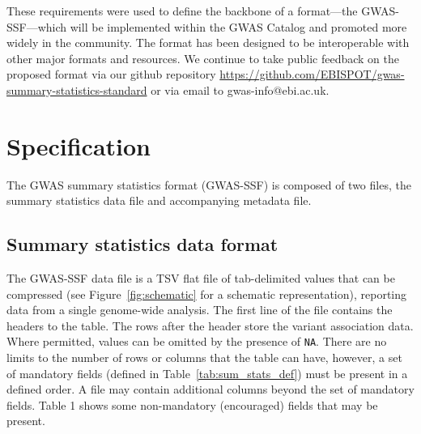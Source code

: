 \documentclass[11pt]{article}
\begin{document}
These requirements were used to define the backbone of a format---the GWAS-SSF---which will be implemented within the GWAS Catalog and promoted more widely in the community. The format has been designed to be interoperable with other major formats and resources. We continue to take public feedback on the proposed format via our github repository \url{https://github.com/EBISPOT/gwas-summary-statistics-standard} or via email to gwas-info@ebi.ac.uk.

\section{Specification}
The GWAS summary statistics format (GWAS-SSF) is composed of two files, the summary statistics data file and accompanying metadata file.

\subsection{Summary statistics data format}
The GWAS-SSF data file is a TSV flat file of tab-delimited values that can be compressed (see Figure~\ref{fig:schematic} for a schematic representation), reporting data from a single genome-wide analysis. The first line of the file contains the headers to the table. The rows after the header store the variant association data. Where permitted, values can be omitted by the presence of \texttt{NA}. There are no limits to the number of rows or columns that the table can have, however, a set of mandatory fields (defined in Table~\ref{tab:sum_stats_def}) must be present in a defined order. A file may contain additional columns beyond the set of mandatory fields. Table 1 shows some non-mandatory (encouraged) fields that may be present.
\end{document}
